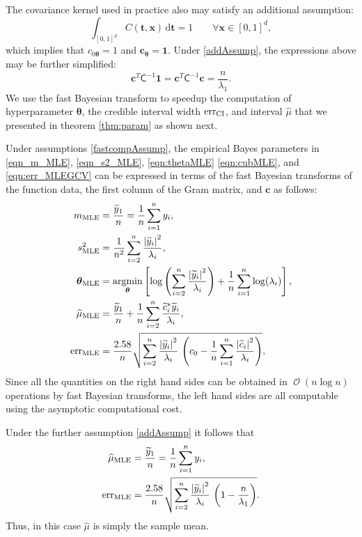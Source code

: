 \documentclass{iitthesis}          %
\DeclareMathOperator{\Order}{{\mathcal O}}
\newcommand{\bm}[1]{\boldsymbol{#1}}
\newcommand{\D}[1]{\text{d}{#1}}
\newcommand{\vtheta}{{\bm{\theta}}}
\newcommand{\vc}{\bm{c}}
\newcommand{\vt}{\bm{t}}
\newcommand{\vx}{\bm{x}}
\newcommand{\vone}{\bm{1}}
\newcommand{\mCInv}{{\mathsf{C}^{-1}}}
\newcommand{\hmu}{\widehat{\mu}}
\newcommand{\MLE}{\textup{MLE}}
\newcommand{\err}{\textup{err}}
\def\abs#1{\ensuremath{\left \lvert #1 \right \rvert}}
\providecommand{\argmin}{\operatorname*{argmin}}
\begin{document}
The covariance kernel used in practice also may satisfy an additional assumption:
\begin{equation} \label{addAssump}
\int_{[0,1]^d} C(\vt,\vx) \, \D \vt = 1 \qquad \forall \vx \in [0,1]^d,
\end{equation}
which implies that $c_{0 \vtheta} = 1$ and $\vc_{\vtheta} = \vone$.  Under \eqref{addAssump}, the expressions above may be further simplified:
\begin{equation*}
\vc^T\mCInv \vone =
\vc^T\mCInv \vc = \frac{n}{\lambda_1}.
\end{equation*}
We use the fast Bayesian transform to speedup the computation of hyperparameter $\vtheta$, the credible interval width $\err_{\textup{CI}}$, and interval $\hmu$ that we presented in theorem \ref{thm:param} as shown next.






Under assumptions \eqref{fastcompAssump}, the empirical Bayes parameters in \eqref{eqn_m_MLE}, \eqref{eqn_s2_MLE}, \eqref{eqn:thetaMLE} \eqref{eqn:cubMLE}, and \eqref{eqn:err_MLEGCV} can be expressed in terms of the fast Bayesian transforms of the function data, the first column of the Gram matrix, and $\vc$ as follows:
\begin{align*}
\nonumber
m_\MLE &=  \frac{\widetilde{y}_1}{n} = \frac 1n \sum_{i=1}^n y_i,
\\
\nonumber
s^2_\MLE 
& =
\frac{1}{n^2} 
\sum_{i=2}^n \frac{\abs{\widetilde{y}_i}^2}{\lambda_i}, \\
\vtheta_\MLE
&= 
\argmin_{\vtheta}
\left[
\log\left(
\sum_{i=2}^n \frac{\abs{\widetilde{y}_i}^2}{\lambda_i}
\right)   + 
\frac{1}{n}\sum_{i=1}^n \log(\lambda_i)
\right],
\\
\nonumber
\hmu_\MLE  &= 
\frac{\widetilde{y}_1}{n} +
\frac 1n \sum_{i=2}^n \frac{ \widetilde{c}_i^* \widetilde{y}_i}{\lambda_i}, \\
\nonumber
\err_\MLE  &
=
\frac{2.58}{n}\sqrt{
	\sum_{i=2}^{n} \frac{\abs{\widetilde{y}_i}^2}{\lambda_i}  
	\,
	\left( c_0 - \frac 1n \sum_{i=1}^n \frac{\abs{\widetilde{c}_i}^2}{\lambda_i} \right) 
},
\end{align*}
Since all the quantities on the right hand sides can be obtained in $\Order(n \log n)$ operations by fast Bayesian transforms, the left hand sides are all computable using the asymptotic computational cost.

Under the further assumption \eqref{addAssump} it follows that 
\begin{align*}
\nonumber
\hmu_\MLE  &= 
\frac{\widetilde{y}_1}{n} = \frac 1n \sum_{i=1}^n y_i,\\
\err_\MLE  &
=
\frac{2.58}{n}\sqrt{
	\sum_{i=2}^{n} \frac{\abs{\widetilde{y}_i}^2}{\lambda_i}  
	\,
	\left( 1 -  \frac{n}{\lambda_1} \right) 
}.
\end{align*}
Thus, in this  case $\hmu$ is simply the sample mean.
\end{document}
